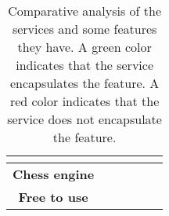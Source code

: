\begin{table}[h]
{\begin{tabular}{clllll}
            \multicolumn{1}{l}{\cellcolor[HTML]{FD6864}}                     &
            \multicolumn{1}{l}{\cellcolor[HTML]{67FD9A}}                   &
            \multicolumn{1}{l}{\cellcolor[HTML]{67FD9A}}                        &
            \\ \midrule
            \rowcolor[HTML]{FD6864}
            \cellcolor[HTML]{EFEFEF}\textbf{Chess engine}                           &
            \multicolumn{1}{l}{\cellcolor[HTML]{67FD9A}}                   &
            \multicolumn{1}{l}{\cellcolor[HTML]{67FD9A}}                     &
            \multicolumn{1}{l}{\cellcolor[HTML]{FD6864}}                   &
            \multicolumn{1}{l}{\cellcolor[HTML]{FD6864}}                        &
            \\ \midrule
            \rowcolor[HTML]{67FD9A}
            \cellcolor[HTML]{EFEFEF}\textbf{Free to use}                            &
            \multicolumn{1}{l}{\cellcolor[HTML]{67FD9A}}                   &
            \multicolumn{1}{l}{\cellcolor[HTML]{67FD9A}}                     &
            \multicolumn{1}{l}{\cellcolor[HTML]{67FD9A}}                   &
            \multicolumn{1}{l}{\cellcolor[HTML]{FD6864}}                        &
            \\ \bottomrule
        \end{tabular}%
    }
    \caption{Comparative analysis of the services and some features they have.
    A green color indicates that the service encapsulates the feature.
    A red color indicates that the service does not encapsulate the feature.}\label{tab:comparative-analysis}
\end{table}
